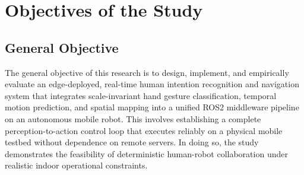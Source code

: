 \section{Objectives of the Study}

\subsection{General Objective}
The general objective of this research is to design, implement, and empirically evaluate an edge-deployed, real-time human intention recognition and navigation system that integrates scale-invariant hand gesture classification, temporal motion prediction, and spatial mapping into a unified ROS2 middleware pipeline on an autonomous mobile robot. This involves establishing a complete perception-to-action control loop that executes reliably on a physical mobile testbed without dependence on remote servers. In doing so, the study demonstrates the feasibility of deterministic human-robot collaboration under realistic indoor operational constraints.

